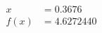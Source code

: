 \documentclass[preview]{standalone}
\begin{document}
\begin{align*}
x &= 0.3676\\f(x) &= 4.6272440
\end{align*}
\end{document}
